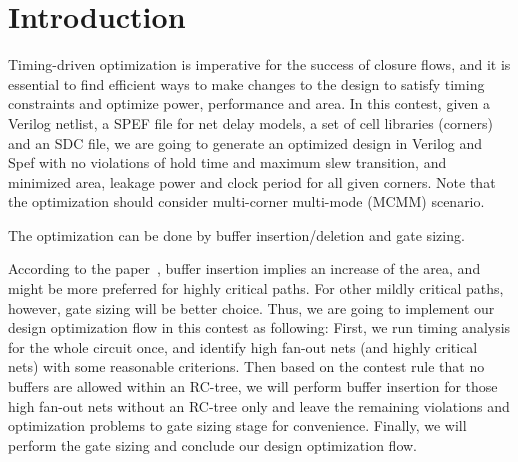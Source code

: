 \section{Introduction}
Timing-driven optimization is imperative for the success of closure flows, and it is essential to find efficient ways to make changes to the design to satisfy timing constraints and optimize power, performance and area. In this contest, given a Verilog netlist, a SPEF file for net delay models, a set of cell libraries (corners) and an SDC file, we are going to generate an optimized design in Verilog and Spef with no violations of hold time and maximum slew transition, and minimized area, leakage power and clock period for all given corners. Note that the optimization should consider multi-corner multi-mode (MCMM) scenario.

The optimization can be done by buffer insertion/deletion and gate sizing. 


According to the paper~\cite{Jiang:Interleaving}, buffer insertion implies an increase of the area, and might be more preferred for highly critical paths. For other mildly critical paths, however, gate sizing will be better choice. Thus, we are going to implement our design optimization flow in this contest as following: First, we run timing analysis for the whole circuit once, and identify high fan-out nets (and highly critical nets) with some reasonable criterions. Then based on the contest rule that no buffers are allowed within an RC-tree, we will perform buffer insertion for those high fan-out nets without an RC-tree only and leave the remaining violations and optimization problems to gate sizing stage for convenience. Finally, we will perform the gate sizing and conclude our design optimization flow.




